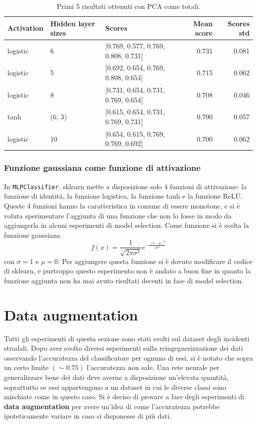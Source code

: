 \documentclass[12pt, twoside, letterpaper]{report}
\begin{document}
				\begin{table}
					\begin{tabular}{lllrr}
					\toprule
					Activation & Hidden layer sizes &                               Scores &  Mean score &  Scores std \\
					\midrule
					logistic &                  6 &  [0.769, 0.577, 0.769, 0.808, 0.731] &       0.731 &       0.081 \\
					logistic &                  5 &  [0.692, 0.654, 0.769, 0.808, 0.654] &       0.715 &       0.062 \\
					logistic &                  8 &  [0.731, 0.654, 0.731, 0.769, 0.654] &       0.708 &       0.046 \\
					tanh &             (6, 3) &  [0.615, 0.654, 0.731, 0.769, 0.731] &       0.700 &       0.057 \\
					logistic &                 10 &  [0.654, 0.615, 0.769, 0.769, 0.692] &       0.700 &       0.062 \\
					\bottomrule
					\end{tabular}
					\caption{Primi 5 risultati ottenuti con PCA come totali.}
					\label{tab:totali_pca}
				\end{table}

			\subsubsection{Funzione gaussiana come funzione di attivazione}
				In \texttt{MLPClassifier}, sklearn mette a disposizione solo 4 funzioni di attivazione: la funzione di identità, la funzione logistica, la funzione tanh e la funzione ReLU. Queste 4 funzioni hanno la caratteristica in comune di essere monotone, e si è voluta sperimentare l'aggiunta di una funzione che non lo fosse in modo da aggiungerla in alcuni esperimenti di model selection. Come funzione si è scelta la funzione gaussiana $$f(x) = \frac{1}{\sqrt{2 \pi \sigma ^ 2}} e^{- \frac{(x - \mu)^2}{2 \sigma^2}}$$  con $\sigma = 1$ e $\mu = 0$. Per aggiungere questa funzione si è dovuto modificare il codice di sklearn, e purtroppo questo esperimento non è andato a buon fine in quanto la funzione aggiunta non ha mai avuto risultati decenti in fase di model selection.
	
	\section{Data augmentation}
		Tutti gli esperimenti di questa sezione sono stati svolti sul dataset degli incidenti stradali. Dopo aver svolto diversi esperimenti sulla reingegnerizzazione dei dati osservando l'accuratezza del classificatore per ognuno di essi, si è notato che sopra un certo limite $(\sim 0.75)$ l'accuratezza non sale. Una rete neurale per generalizzare bene dei dati deve averne a disposizione un'elevata quantità, soprattutto se essi appartengono a un dataset in cui le diverse classi sono mischiate come in questo caso.  Si è deciso di provare a fare degli esperimenti di \textbf{data augmentation} per avere un'idea di come l'accuratezza potrebbe ipoteticamente variare in caso si disponesse di più dati.
		
\end{document}
